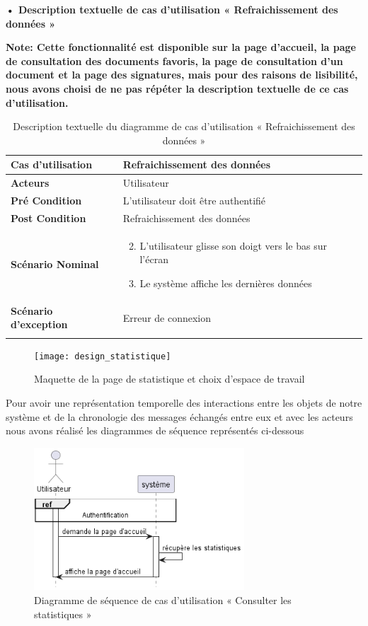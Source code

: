 \textbf{•	Description textuelle de cas d'utilisation « Refraichissement
des données »}

\textbf{Note: Cette fonctionnalité est disponible sur la page d'accueil, la page de consultation des documents favoris, la page de consultation d'un document et la page des signatures, mais pour des raisons de lisibilité, nous avons choisi de ne pas répéter la description textuelle de ce cas d'utilisation.}

\begin{longtable}{|p{5cm}|p{10cm}|}
\hline
\textbf{Cas d'utilisation}&Refraichissement des données\\
\hline
\textbf{Acteurs}&Utilisateur \\
\hline
\textbf{Pré Condition}&L'utilisateur doit être authentifié\\
\hline
\textbf{Post Condition}&Refraichissement des données\\
\hline
\textbf{Scénario Nominal}&
\vspace{-\baselineskip}
\begin{enumerate}
    \setcounter{enumi}{1}
      \item L'utilisateur glisse son doigt vers le bas sur l'écran
      \item Le système affiche les dernières données
\end{enumerate}\\
\hline
\textbf{Scénario d'exception}&Erreur de connexion\\
\hline
\caption{Description textuelle du diagramme de cas d'utilisation « Refraichissement des données »}
\label{tab:use_case_refraichissement_donnees}
\end{longtable}

\begin{figure}[H]
  \centering
  \texttt{[image: design\_statistique]}
  \caption{Maquette de la page de statistique et choix d'espace de travail}
  \label{fig:design_statistique}
\end{figure}


Pour avoir une représentation temporelle des interactions entre les objets de notre système et de la chronologie des messages échangés entre eux et avec les acteurs nous avons réalisé les diagrammes de séquence représentés ci-dessous

\begin{figure}[H]
  \centering
  \includegraphics[width=0.7\textwidth]{out/diagrams/sprint7/view_stats/view_stats}
  \caption{Diagramme de séquence de cas d'utilisation « Consulter les statistiques »}
  \label{fig:sequence_view_stats}
\end{figure}

